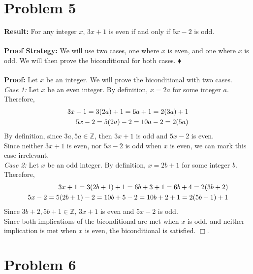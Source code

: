 \documentclass[11pt]{article}
\begin{document}
\newpage



\section*{Problem 5}

    \textbf{Result:} For any integer $x$, $3x+1$ is even if and only if $5x-2$ is odd.\\
    \\
    \textbf{Proof Strategy:} We will use two cases, one where $x$ is even, and one where $x$ is odd. We will then prove the biconditional for both cases. \hfill $\blacklozenge$\\
    \\
    \textbf{Proof:} Let $x$ be an integer. We will prove the biconditional with two cases. \\
    \textit{Case 1:} Let $x$ be an even integer. By definition, $x = 2a$ for some integer $a$. Therefore,
    \begin{align}
        3x+1 = 3(2a)+1 = 6a+1 = 2(3a)+1 \notag \\
        5x-2 = 5(2a)-2 = 10a-2 = 2(5a) \notag
    \end{align}
    By definition, since $3a, 5a \in \mathbb{Z}$, then $3x+1$ is odd and $5x-2$ is even.\\
    Since neither $3x+1$ is even, nor $5x-2$ is odd when $x$ is even, we can mark this case irrelevant.\\
    \textit{Case 2:} Let $x$ be an odd integer. By definition, $x = 2b+1$ for some integer $b$. Therefore,
    \begin{align}
        3x+1 = 3(2b+1)+1 = 6b+3+1 = 6b+4 = 2(3b+2) \notag \\
        5x-2 = 5(2b+1)-2 = 10b+5-2 = 10b+2+1 = 2(5b+1)+1 \notag
    \end{align}
    Since $3b+2, 5b+1 \in \mathbb{Z}$, $3x+1$ is even and $5x-2$ is odd.\\
    Since both implications of the biconditional are met when $x$ is odd, and neither implication is met when $x$ is even, the biconditional is satisfied. \hfill $\Box$.

\newpage


\section*{Problem 6}
\end{document}
